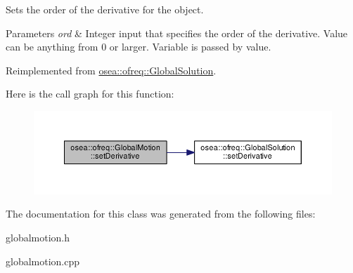 Sets the order of the derivative for the object. 


\begin{DoxyParams}{Parameters}
{\em ord} & Integer input that specifies the order of the derivative. Value can be anything from 0 or larger. Variable is passed by value. \\
\hline
\end{DoxyParams}


Reimplemented from \hyperlink{classosea_1_1ofreq_1_1_global_solution_a537163391f1f55d073720b20f69acfa5}{osea\-::ofreq\-::\-Global\-Solution}.



Here is the call graph for this function\-:\nopagebreak
\begin{figure}[H]
\begin{center}
\leavevmode
\includegraphics[width=350pt]{classosea_1_1ofreq_1_1_global_motion_a15a8c0d57ffedf65a1cd84154cdaa6ae_cgraph}
\end{center}
\end{figure}




The documentation for this class was generated from the following files\-:\begin{DoxyCompactItemize}
\item 
globalmotion.\-h\item 
globalmotion.\-cpp\end{DoxyCompactItemize}
